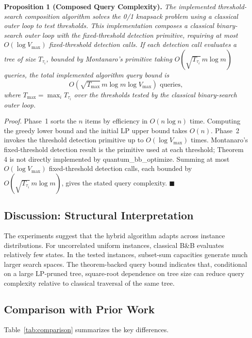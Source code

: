 \documentclass[conference]{IEEEtran} \IEEEoverridecommandlockouts
\begin{document}
\textbf{Proposition 1 (Composed Query Complexity).} \textit{The implemented threshold-search composition algorithm solves the 0/1 knapsack problem using a classical outer loop to test thresholds. This implementation composes a classical binary-search outer loop with the fixed-threshold detection primitive, requiring at most $O(\log V_{\max})$ fixed-threshold detection calls. If each detection call evaluates a tree of size $T_{\tau_i}$, bounded by Montanaro's primitive taking $O(\sqrt{T_{\tau_i}}\,m\log m)$ queries, the total implemented algorithm query bound is}
\begin{equation}
    O\!\left(\sqrt{T_{\max}}\,m\log m\log V_{\max}\right) \text{ queries},
    \label{eq:totalcomplexity}
\end{equation}
\textit{where $T_{\max} = \max_i T_{\tau_i}$ over the thresholds tested by the classical binary-search outer loop.}

\textit{Proof.} Phase~1 sorts the $n$ items by efficiency in $O(n \log n)$ time. Computing the greedy lower bound and the initial LP upper bound takes $O(n)$. Phase~2 invokes the threshold detection primitive up to $O(\log V_{\max})$ times. Montanaro's fixed-threshold detection result is the primitive used at each threshold; Theorem 4 is not directly implemented by quantum\_bb\_optimize. Summing at most $O(\log V_{\max})$ fixed-threshold detection calls, each bounded by $O(\sqrt{T_{\tau_i}}\,m\log m)$, gives the stated query complexity. \hfill$\blacksquare$

\subsection{Discussion: Structural Interpretation}
The experiments suggest that the hybrid algorithm adapts across instance distributions. For uncorrelated uniform instances, classical B\&B evaluates relatively few states. In the tested instances, subset-sum capacities generate much larger search spaces. The theorem-backed query bound indicates that, conditional on a large LP-pruned tree, square-root dependence on tree size can reduce query complexity relative to classical traversal of the same tree.

\subsection{Comparison with Prior Work}

Table~\ref{tab:comparison} summarizes the key differences.
\end{document}
